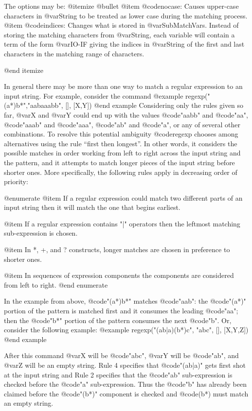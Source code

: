 The options may be:
@itemize @bullet
@item @code{nocase}: Causes upper-case characters  in  @var{String} to
        be treated  as  lower case during the matching process.
@item @code{indices}: Changes what  is  stored  in
@var{SubMatchVars}. Instead  of storing the matching characters from
@var{String}, each variable will contain a term of the form @var{IO-IF}
giving the indices in @var{String} of the first and last characters  in
the  matching range of characters.

@end itemize

In general there may be more than one way to match a regular expression
to an input string.  For example,  consider the command
@example
  regexp("(a*)b*","aabaaabb", [], [X,Y])
@end example
Considering only the rules given so far, @var{X} and @var{Y} could end up
with the values @code{"aabb"} and @code{"aa"}, @code{"aaab"} and
@code{"aaa"}, @code{"ab"} and @code{"a"}, or any of several other
combinations.  To resolve this potential ambiguity @code{regexp} chooses among
alternatives using the rule ``first then longest''.  In other words, it
considers the possible matches in order working from left to right
across the input string and the pattern, and it attempts to match longer
pieces of the input string before shorter ones.  More specifically, the
following rules apply in decreasing order of priority:


@enumerate 
@item    If a regular expression could match  two  different parts of an
input string then it will match the one that begins earliest.

@item  If a regular expression contains "|"  operators  then the leftmost matching sub-expression is chosen.

@item In *, +, and ? constructs, longer matches are chosen in preference to shorter ones.

@item In sequences of expression  components  the  components are considered from left to right.
@end enumerate

In the example from above, @code{"(a*)b*"} matches @code{"aab"}: the
@code{"(a*)"} portion of the pattern is matched first and it consumes
the leading @code{"aa"}; then the @code{"b*"} portion of the pattern
consumes the next @code{"b"}.  Or, consider the following example: 
@example
  regexp("(ab|a)(b*)c",  "abc", [], [X,Y,Z])
@end example

After this command @var{X} will be @code{"abc"}, @var{Y} will be
@code{"ab"}, and @var{Z} will be an empty string.  Rule 4 specifies that
@code{"(ab|a)"} gets first shot at the input string and Rule 2 specifies
that the @code{"ab"} sub-expression is checked before the @code{"a"}
sub-expression.  Thus the @code{"b"} has already been claimed before the
@code{"(b*)"} component is checked and @code{(b*)} must match an empty string.

